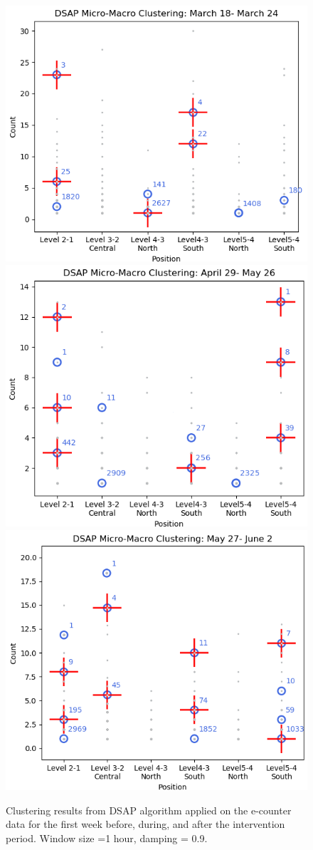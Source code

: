 \begin{figure}[!t]
    \centering
    \includegraphics[width=.47\textwidth]{image/Chapters/Chapter6/beforeInte1week.png}
    \includegraphics[width=.47\textwidth]{image/Chapters/Chapter6/duringInte1week.png}
    \includegraphics[width=.47\textwidth]{image/Chapters/Chapter6/afterInte1week.png}
    \caption{Clustering results from DSAP algorithm applied on the e-counter data for the first week before, during, and after the intervention period. Window size =1 hour, damping = 0.9.}
    \label{dsap3week}
\end{figure}





